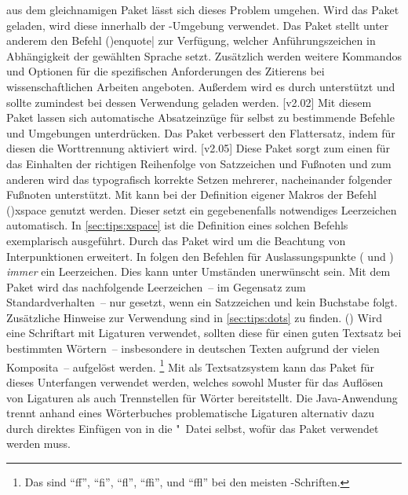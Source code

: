 \begin{DeclarePackages}[Typografie]
  aus dem gleichnamigen Paket lässt sich dieses Problem umgehen. Wird das Paket 
  geladen, wird diese innerhalb der -Umgebung verwendet.
  Das Paket stellt unter anderem den Befehl 
  \Macro(){enquote|}
  zur Verfügung, welcher Anführungszeichen in Abhängigkeit der gewählten 
  Sprache setzt. Zusätzlich werden weitere Kommandos und Optionen für die 
  spezifischen Anforderungen des Zitierens bei wissenschaftlichen Arbeiten 
  angeboten. Außerdem wird es durch  unterstützt und sollte 
  zumindest bei dessen Verwendung geladen werden.
[v2.02]
  Mit diesem Paket lassen sich automatische Absatzeinzüge für selbst zu 
  bestimmende Befehle und Umgebungen unterdrücken.
  Das Paket verbessert den Flattersatz, indem für diesen die Worttrennung 
  aktiviert wird.
[v2.05]
  Diese Paket sorgt zum einen für das Einhalten der richtigen Reihenfolge von 
  Satzzeichen und Fußnoten und zum anderen wird das typografisch korrekte 
  Setzen mehrerer, nacheinander folgender Fußnoten unterstützt.
  Mit  kann bei der Definition eigener Makros der Befehl 
  \Macro(){xspace} genutzt werden. Dieser setzt ein 
  gegebenenfalls notwendiges Leerzeichen automatisch. In 
  \autoref{sec:tips:xspace} ist die Definition eines solchen Befehls 
  exemplarisch ausgeführt. Durch das Paket  wird 
   um die Beachtung von Interpunktionen erweitert.
  In  folgen den Befehlen für Auslassungspunkte ( 
  und ) \emph{immer} ein Leerzeichen. Dies kann unter 
  Umständen unerwünscht sein. Mit dem Paket  wird das 
  nachfolgende Leerzeichen~-- im Gegensatz zum Standardverhalten~-- nur 
  gesetzt, wenn ein Satzzeichen und kein Buchstabe folgt.
  Zusätzliche Hinweise zur Verwendung sind in \autoref{sec:tips:dots} zu finden.
()
  Wird eine Schriftart mit Ligaturen verwendet, sollten diese für einen guten 
  Textsatz bei bestimmten Wörtern~-- insbesondere in deutschen Texten aufgrund 
  der vielen Komposita~-- aufgelöst werden.%
  \footnote{%
    Das sind \enquote{ff}, \enquote{fi}, \enquote{fl}, \enquote{ffi}, und 
    \enquote{ffl} bei den meisten -Schriften.%
  }
  Mit  als Textsatzsystem kann das Paket  
  für dieses Unterfangen verwendet werden, welches sowohl Muster für das 
  Auflösen von Ligaturen als auch Trennstellen für Wörter bereitstellt. 
  Die Java-Anwendung  trennt anhand eines Wörterbuches 
  problematische Ligaturen alternativ dazu durch direktes Einfügen von 
   in die "~Datei selbst, wofür das Paket 
   verwendet werden muss.
\end{DeclarePackages}



